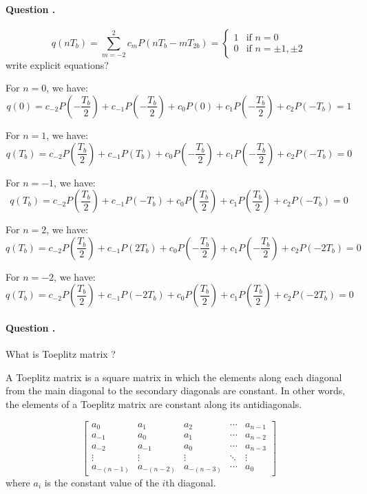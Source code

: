 \documentclass[14pt,a4paper]{report}
\newcounter{question}
\newcommand*\question{%
\stepcounter{question}%
\paragraph{Question \thesection.\thequestion}}
\begin{document}
\question
{
    \[
    q(nT_b) = \sum_{m=-2}^2 c_m P(nT_b - mT_{2b}) =
     \begin{cases}
    1 & \text{if } n = 0 \\
    0 & \text{if } n = \pm 1 , \pm 2 
    \end{cases}
    \] write explicit equations?
}
\begin{answer_box*}
    For $n = 0$, we have:
    \begin{equation}
        q(0) = c_{-2}P(-\frac{T_{b}}{2}) + c_{-1}P(-\frac{T_{b}}{2}) + c_0P(0) + c_1P(-\frac{T_{b}}{2}) + c_2P(-T_{b}) = 1
    \end{equation}

    For $n = 1$, we have:
    \begin{equation}
        q(T_b) = c_{-2}P(\frac{T_{b}}{2}) + c_{-1}P(T_{b}) + c_0P(-\frac{T_{b}}{2}) + c_1P(-\frac{T_{b}}{2}) + c_2P(-T_{b}) = 0
    \end{equation}

    For $n = -1$, we have:
    \begin{equation}
        q(T_b) = c_{-2}P(\frac{T_{b}}{2}) + c_{-1}P(- T_{b}) + c_0P(\frac{T_{b}}{2}) + c_1P(\frac{T_{b}}{2}) + c_2P(-T_{b}) = 0
    \end{equation}

    For $n = 2$, we have:
    \begin{equation}
        q(T_b) = c_{-2}P(\frac{T_{b}}{2}) + c_{-1}P(2T_{b}) + c_0P(-\frac{T_{b}}{2}) + c_1P(-\frac{T_{b}}{2}) + c_2P(-2T_{b}) = 0
    \end{equation}

    For $n = -2$, we have:
    \begin{equation}
        q(T_b) = c_{-2}P(\frac{T_{b}}{2}) + c_{-1}P(-2T_{b}) + c_0P(\frac{T_{b}}{2}) + c_1P(\frac{T_{b}}{2}) + c_2P(-2T_{b}) = 0
    \end{equation}
\end{answer_box*}

\question
{
    What is Toeplitz matrix ? 
}
\begin{answer_box*}
A Toeplitz matrix is a square matrix in which the elements along each diagonal from the main diagonal to the secondary diagonals are constant. In other words, the elements of a Toeplitz matrix are constant along its antidiagonals.


\begin{equation}
\begin{bmatrix}
a_0 & a_1 & a_2 & \cdots & a_{n-1} \\
a_{-1} & a_0 & a_1 & \cdots & a_{n-2} \\
a_{-2} & a_{-1} & a_0 & \cdots & a_{n-3} \\
\vdots & \vdots & \vdots & \ddots & \vdots \\
a_{-(n-1)} & a_{-(n-2)} & a_{-(n-3)} & \cdots & a_0
\end{bmatrix}
\end{equation}
where $a_i$ is the constant value of the $i$th diagonal.

\end{answer_box*}
\end{document}
